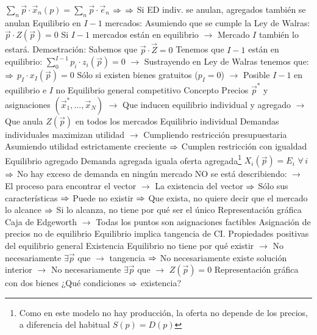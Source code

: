 \documentclass{nuevotema}
\begin{document}
\begin{esquemal}
				\4[] $\sum_n \vec{p} \cdot \vec{x}_n(p) = \sum_n \vec{p} \cdot \vec{e}_n$
				\4[] $\Rightarrow$ 
				\4[] $\Rightarrow$ Si ED indiv. se anulan, agregados también se anulan
				\4 Equilibrio en $I-1$ mercados:
				\4[] Asumiendo que se cumple la Ley de Walras:
				\4[] $\vec{p} \cdot Z(\vec{p}) = 0$
				\4[] Si $I-1$ mercados están en equilibrio
				\4[] $\to$ Mercado $I$ también lo estará.
				\4[] Demostración:
				\4[] Sabemos que $\vec{p}\cdot \vec{Z} = 0$
				\4[] Tenemos que $I-1$ están en equilibrio:
				\4[] $\sum^{I-1}_0 p_i \cdot z_i(\vec{p}) = 0$
				\4[] $\to$ Sustrayendo en Ley de Walras tenemos que:
				\4[] $\Rightarrow$ $p_I \cdot x_I (\vec{p}) = 0$
				\4[] Sólo si existen bienes gratuitos ($p_I = 0$)
				\4[] $\to$ Posible $I-1$ en equilibrio e $I$ no
			\3 Equilibrio general competitivo
				\4 Concepto
				\4[] Precios $\vec{p}^*$ y asignaciones $(\vec{x}_1^*,...,\vec{x}_N)$
				\4[] $\to$ Que inducen equilibrio individual y agregado
				\4[] $\to$ Que anula $Z(\vec{p})$ en todos los mercados
				\4 Equilibrio individual
				\4[] Demandas individuales maximizan utilidad
				\4[] $\to$ Cumpliendo restricción presupuestaria
				\4[] Asumiendo utilidad estrictamente creciente
				\4[] $\Rightarrow$ Cumplen restricción con igualdad
				\4 Equilibrio agregado
				\4[] Demanda agregada iguala oferta agregada\footnote{Como en este modelo no hay producción, la oferta no depende de los precios, a diferencia del habitual $S(p) = D(p)$}
				\4[] $X_i(\vec{p}) = E_i$ $\forall \, i$
				\4[] $\Rightarrow$ No hay exceso de demanda en ningún mercado
				\4 NO se está describiendo:
				\4[] $\to$ El proceso para encontrar el vector
				\4[] $\to$ La existencia del vector
				\4[] $\Rightarrow$ Sólo sus características
				\4[] $\Rightarrow$ Puede no existir
				\4[] $\Rightarrow$ Que exista, no quiere decir que el mercado lo alcance
				\4[] $\Rightarrow$ Si lo alcanza, no tiene por qué ser el único
				\4 Representación gráfica
				\4[] Caja de Edgeworth
				\4[] $\to$ Todas los puntos son asignaciones factibles
				\4[] Asignación de precios no de equilibrio
				\4[] Equilibrio implica tangencia de CI.
				\4[] 
		\2 Propiedades positivas del equilibrio general
			\3 Existencia
				\4 Equilibrio no tiene por qué existir
				\4[] $\to$ No necesariamente $\exists \vec{p}$ que $\to$ tangencia
				\4[] $\Rightarrow$ No necesariamente existe solución interior
				\4[] $\to$ No necesariamente $\exists \vec{p}$ que $\to$ $Z(\vec{p}) = 0$
				\4 Representación gráfica con dos bienes
				\4[] 
				\4 ¿Qué condiciones $\Rightarrow$ existencia?

\end{esquemal}
\end{document}
